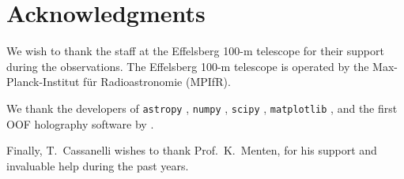 \documentclass[
    ]
    {aa}
\begin{document}
    \section{Acknowledgments}
    We wish to thank the staff at the Effelsberg 100-m telescope for their support during the observations. The Effelsberg 100-m telescope is operated by the Max-Planck-Institut f\"ur Radioastronomie (MPIfR).

    We thank the developers of \texttt{astropy} \citep{2013A&A...558A..33A,2018AJ....156..123A}, \texttt{numpy} \citep{2020arXiv200610256H}, \texttt{scipy} \citep{2020NatMe..17..261V}, \texttt{matplotlib} \citep{2007CSE.....9...90H}, and the first OOF holography software by \cite{2007A&A...465..679N}.

    Finally, T.~Cassanelli wishes to thank Prof.~K.~Menten, for his support and invaluable help during the past years.

\end{document}
